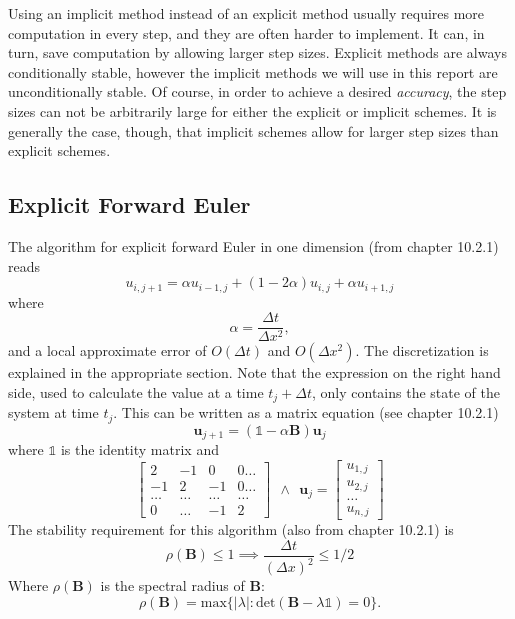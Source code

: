 \documentclass[reprint, english,notitlepage,nofootinbib]{revtex4-1}  %
\begin{document}
Using an implicit method instead of an explicit method usually requires more computation in every step, and they are often harder to implement. It can, in turn, save computation by allowing larger step sizes. Explicit methods are always conditionally stable, however the implicit methods we will use in this report are unconditionally stable. Of course, in order to achieve a desired \textit{accuracy}, the step sizes can not be arbitrarily large for either the explicit or implicit schemes. It is generally the case, though, that implicit schemes allow for larger step sizes than explicit schemes.

\subsection*{Explicit Forward Euler}

The algorithm for explicit forward Euler in one dimension (from \cite{lectures2015} chapter 10.2.1) reads
\begin{equation}
  \label{eq:forward_euler}
	u_{i, j+1} = \alpha u_{i-1, j} + (1 - 2\alpha) u_{i,j} + \alpha u_{i+1, j}
\end{equation}
where
\begin{equation*}
	\alpha = \frac{\Delta t}{\Delta x^2},
\end{equation*}
and a local approximate error of $O(\Delta t)$ and $O(\Delta x ^2)$. The discretization is explained in the appropriate section. Note that the expression on the right hand side, used to calculate the value at a time $t_j + \Delta t$, only contains the state of the system at time $t_j$. This can be written as a matrix equation (see \cite{lectures2015} chapter 10.2.1)
\begin{equation*}
	\mathbf{u}_{j+1} = (\mathds{1} - \alpha \mathbf{B})\mathbf{u}_j
\end{equation*}
where $\mathds{1}$ is the identity matrix and
\begin{equation*}
	\begin{bmatrix}
	2 & -1 & 0 & 0\dots \\
	-1 & 2 & -1 & 0\dots\\
	\dots & \dots & \dots &\dots \\
	0 & \dots & -1 & 2
	\end{bmatrix}	 \ \ \wedge \ \
	\mathbf{u}_{j} = \begin{bmatrix}
	u_{1,j} \\
	u_{2,j} \\
	\ldots \\
	u_{n,j}
	\end{bmatrix}
\end{equation*}
The stability requirement for this algorithm (also from \cite{lectures2015} chapter 10.2.1) is
\begin{equation}
	\label{eq:von_neumann_stability}
	\rho(\mathbf{B}) \le 1 \implies \frac{\Delta t}{(\Delta x)^2} \le 1/2
\end{equation}
Where $\rho(\mathbf{B})$ is the spectral radius of $\mathbf{B}$:
\begin{equation*}
	\rho(\mathbf{B}) = \text{max}\{|\lambda|:\text{det}(\mathbf{B}- \lambda \mathds{1}) = 0\}.
\end{equation*}
\end{document}
